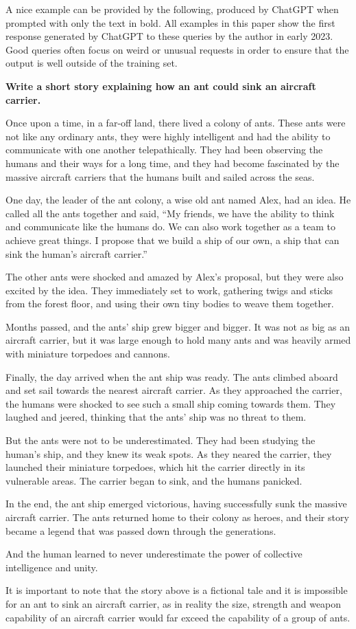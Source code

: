 \documentclass[output=paper,colorlinks,citecolor=brown
]{langscibook}
\begin{document}
A nice example can be provided by the following, produced by ChatGPT when prompted with only the text in bold. All examples in this paper show the first response generated by ChatGPT to these queries by the author in early 2023. Good queries often focus on weird or unusual requests in order to ensure that the output is well outside of the training set. 
\begin{myquote}
\textbf{Write a short story explaining how an ant could sink an aircraft carrier.}

Once upon a time, in a far-off land, there lived a colony of ants. These ants were not like any ordinary ants, they were highly intelligent and had the ability to communicate with one another telepathically. They had been observing the humans and their ways for a long time, and they had become fascinated by the massive aircraft carriers that the humans built and sailed across the seas.

One day, the leader of the ant colony, a wise old ant named Alex, had an idea. He called all the ants together and said, ``My friends, we have the ability to think and communicate like the humans do. We can also work together as a team to achieve great things. I propose that we build a ship of our own, a ship that can sink the human's aircraft carrier.''

The other ants were shocked and amazed by Alex's proposal, but they were also excited by the idea. They immediately set to work, gathering twigs and sticks from the forest floor, and using their own tiny bodies to weave them together.

Months passed, and the ants' ship grew bigger and bigger. It was not as big as an aircraft carrier, but it was large enough to hold many ants and was heavily armed with miniature torpedoes and cannons.

Finally, the day arrived when the ant ship was ready. The ants climbed aboard and set sail towards the nearest aircraft carrier. As they approached the carrier, the humans were shocked to see such a small ship coming towards them. They laughed and jeered, thinking that the ants' ship was no threat to them.

But the ants were not to be underestimated. They had been studying the human's ship, and they knew its weak spots. As they neared the carrier, they launched their miniature torpedoes, which hit the carrier directly in its vulnerable areas. The carrier began to sink, and the humans panicked.

In the end, the ant ship emerged victorious, having successfully sunk the massive aircraft carrier. The ants returned home to their colony as heroes, and their story became a legend that was passed down through the generations.

And the human learned to never underestimate the power of collective intelligence and unity.

It is important to note that the story above is a fictional tale and it is impossible for an ant to sink an aircraft carrier, as in reality the size, strength and weapon capability of an aircraft carrier would far exceed the capability of a group of ants.
\end{myquote}
\end{document}
